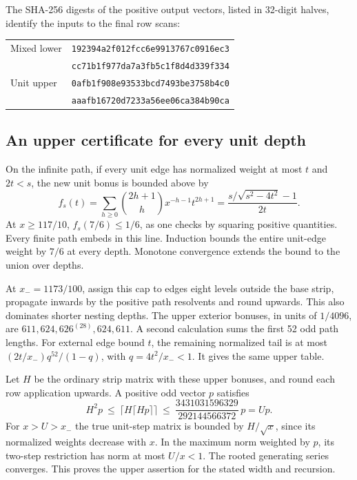 \documentclass[11pt]{article}
\begin{document}
The SHA-256 digests of the positive output vectors, listed in 32-digit halves, identify the inputs to the final row scans:
\begin{center}\small\begin{tabular}{ll}
Mixed lower & \texttt{192394a2f012fcc6e9913767c0916ec3}\\
&\texttt{cc71b1f977da7a3fb5c1f8d4d339f334}\\[2pt]
Unit upper & \texttt{0afb1f908e93533bcd7493be3758b4c0}\\
&\texttt{aaafb16720d7233a56ee06ca384b90ca}
\end{tabular}\end{center}


\subsection{An upper certificate for every unit depth}
On the infinite path, if every unit edge has normalized weight at most \(t\) and \(2t<s\), the new unit bonus is bounded above by
\[
 f_s(t)=\sum_{h\ge0}\binom{2h+1}{h}x^{-h-1}t^{2h+1}
      =\frac{s/\sqrt{s^2-4t^2}-1}{2t}.
\]
At \(x\ge117/10\), \(f_s(7/6)\le1/6\), as one checks by squaring positive quantities. Every finite path embeds in this line. Induction bounds the entire unit-edge weight by \(7/6\) at every depth. Monotone convergence extends the bound to the union over depths.

At \(x_-=1173/100\), assign this cap to edges eight levels outside the base strip, propagate inwards by the positive path resolvents and round upwards. This also dominates shorter nesting depths. The upper exterior bonuses, in units of \(1/4096\), are \(611,624,626^{(28)},624,611\). A second calculation sums the first 52 odd path lengths. For external edge bound \(t\), the remaining normalized tail is at most \((2t/x_-)q^{52}/(1-q)\), with \(q=4t^2/x_-<1\). It gives the same upper table.

Let \(H\) be the ordinary strip matrix with these upper bonuses, and round each row application upwards. A positive odd vector \(p\) satisfies
\[
 H^2p\ \le\ \lceil H\lceil Hp\rceil\rceil\
 \le\ \frac{3431031596329}{292144566372}\,p=U p .
\]
For \(x>U>x_-\) the true unit-step matrix is bounded by \(H/\sqrt{x}\), since its normalized weights decrease with \(x\). In the maximum norm weighted by \(p\), its two-step restriction has norm at most \(U/x<1\). The rooted generating series converges. This proves the upper assertion for the stated width and recursion.
\end{document}
